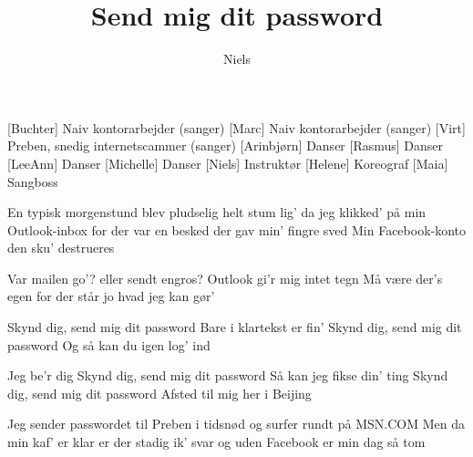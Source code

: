 \documentclass[a4paper,11pt]{article}
\title{Send mig dit password}
\author{Niels}
\begin{document}
\maketitle

\begin{roles}
[Buchter] Naiv kontorarbejder (sanger)
[Marc] Naiv kontorarbejder (sanger)
[Virt] Preben, snedig internetscammer (sanger)
[Arinbjørn] Danser
[Rasmus] Danser
[LeeAnn] Danser
[Michelle] Danser
[Niels] Instruktør
[Helene] Koreograf
[Maia] Sangboss
\end{roles}

\begin{song}


%
En typisk morgenstund
blev pludselig helt stum
lig' da jeg klikked' på min Outlook-inbox
for der var en besked
der gav min' fingre sved
Min Facebook-konto den sku' destrueres

%
Var mailen go'?
eller sendt engros?
Outlook gi'r mig intet tegn
Må være der's egen
for der står jo hvad jeg kan gør'


%
Skynd dig, send mig dit password
Bare i klartekst er fin'
Skynd dig, send mig dit password
Og så kan du igen log' ind

%
Jeg be'r dig
Skynd dig, send mig dit password
Så kan jeg fikse din' ting
Skynd dig, send mig dit password
Afsted til mig her i Beijing


%
Jeg sender passwordet
til Preben i tidsnød
og surfer rundt på MSN.COM
Men da min kaf' er klar
er der stadig ik' svar
og uden Facebook er min dag så tom


\end{song}
\end{document}
